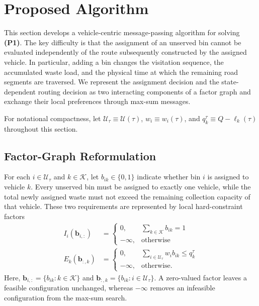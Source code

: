 \section{Proposed Algorithm}
\label{sec:proposed}

This section develops a vehicle-centric message-passing algorithm for solving \textbf{(P1)}. The key difficulty is that the assignment of an unserved bin cannot be evaluated independently of the route subsequently constructed by the assigned vehicle. In particular, adding a bin changes the visitation sequence, the accumulated waste load, and the physical time at which the remaining road segments are traversed. We represent the assignment decision and the state-dependent routing decision as two interacting components of a factor graph and exchange their local preferences through max-sum messages.

For notational compactness, let $\mathcal{U}_{\tau}\equiv\mathcal{U}(\tau)$, $w_i\equiv w_i(\tau)$, and $q_k^{\tau}\equiv Q-\ell_k(\tau)$ throughout this section.

\subsection{Factor-Graph Reformulation}
\label{sec:factor-reformulation}

For each $i\in\mathcal{U}_{\tau}$ and $k\in\mathcal{K}$, let $b_{ik}\in\{0,1\}$ indicate whether bin $i$ is assigned to vehicle $k$. Every unserved bin must be assigned to exactly one vehicle, while the total newly assigned waste must not exceed the remaining collection capacity of that vehicle. These two requirements are represented by local hard-constraint factors
\begin{align}
    I_i(\mathbf{b}_{i,:}) &=
    \begin{cases}
        0, & \sum_{k\in\mathcal{K}}b_{ik}=1\\
        -\infty, & \text{otherwise}
    \end{cases}
    \label{eq:assignment-factor}\\
    E_k(\mathbf{b}_{:,k}) &=
    \begin{cases}
        0, & \sum_{i\in\mathcal{U}_{\tau}}w_i b_{ik}\leq q_k^{\tau}\\
        -\infty, & \text{otherwise}.
    \end{cases}
    \label{eq:capacity-factor}
\end{align}
Here, $\mathbf{b}_{i,:}=\{b_{ik}:k\in\mathcal{K}\}$ and $\mathbf{b}_{:,k}=\{b_{ik}:i\in\mathcal{U}_{\tau}\}$. A zero-valued factor leaves a feasible configuration unchanged, whereas $-\infty$ removes an infeasible configuration from the max-sum search.


